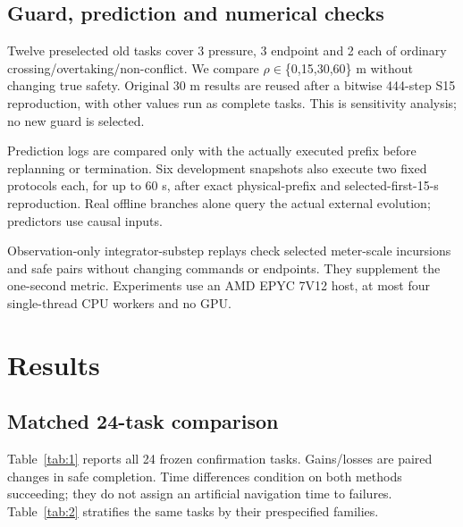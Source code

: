 \documentclass[conference]{IEEEtran}
\begin{document}
\subsection{Guard, prediction and numerical checks}

Twelve preselected old tasks cover 3 pressure, 3 endpoint and 2 each of ordinary crossing/overtaking/non-conflict. We compare \ensuremath{\rho}\ensuremath{\in}\{0,15,30,60\} m without changing true safety. Original 30 m results are reused after a bitwise 444-step S15 reproduction, with other values run as complete tasks. This is sensitivity analysis; no new guard is selected.

Prediction logs are compared only with the actually executed prefix before replanning or termination. Six development snapshots also execute two fixed protocols each, for up to 60 s, after exact physical-prefix and selected-first-15-s reproduction. Real offline branches alone query the actual external evolution; predictors use causal inputs.

Observation-only integrator-substep replays check selected meter-scale incursions and safe pairs without changing commands or endpoints. They supplement the one-second metric. Experiments use an AMD EPYC 7V12 host, at most four single-thread CPU workers and no GPU.

\section{Results}

\subsection{Matched 24-task comparison}

Table~\ref{tab:1} reports all 24 frozen confirmation tasks. Gains/losses are paired changes in safe completion. Time differences condition on both methods succeeding; they do not assign an artificial navigation time to failures. Table~\ref{tab:2} stratifies the same tasks by their prespecified families.
\end{document}
